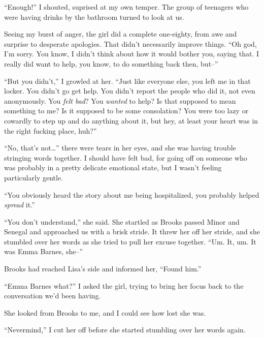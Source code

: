 ``Enough!'' I shouted, suprised at my own temper.  The group of teenagers who were having drinks by the bathroom turned to look at us.



Seeing my burst of anger, the girl did a complete one-eighty, from awe and surprise to desperate apologies.  That didn't necessarily improve things.  ``Oh god, I'm sorry.  You know, I didn't think about how it would bother you, saying that.  I really did want to help, you know, to do something back then, but--''



``But you didn't,'' I growled at her.  ``Just like everyone else, you left me in that locker.  You didn't go get help.  You didn't report the people who did it, not even anonymously.  You \emph{felt bad}?  You \emph{wanted} to help?  Is that supposed to mean something to me?  Is it supposed to be some consolation? You were too lazy or cowardly to step up and do anything about it, but hey, at least your heart was in the right fucking place, huh?''



``No, that's not\ldots'' there were tears in her eyes, and she was having trouble stringing words together.  I should have felt bad, for going off on someone who was probably in a pretty delicate emotional state, but I wasn't feeling particularly gentle.



``You obviously heard the story about me being hospitalized, you probably helped \emph{spread} it.''



``You don't understand,'' she said.  She startled as Brooks passed Minor and Senegal and approached us with a brisk stride.  It threw her off her stride, and she stumbled over her words as she tried to pull her excuse together.  ``Um.  It, um.  It was Emma Barnes, she--''



Brooks had reached Lisa's side and informed her, ``Found him.''



``Emma Barnes what?'' I asked the girl, trying to bring her focus back to the conversation we'd been having.



She looked from Brooks to me, and I could see how lost she was.



``Nevermind,'' I cut her off before she started stumbling over her words again.



